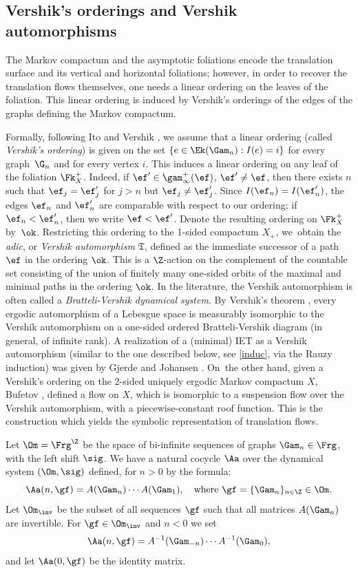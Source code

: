 \subsection{Vershik's orderings and Vershik automorphisms}
The Markov compactum and the asymptotic foliations encode the translation surface and its vertical and horizontal foliations; however, in order to recover the translation flows themselves, one needs a linear ordering on the leaves of the foliation. This linear ordering is induced by Vershik's orderings of the edges of the graphs defining the Markov compactum.

Formally, following Ito \cite{Ito} and Vershik \cite{Vershik1,Vershik2}, we assume that a linear ordering (called \emph{Vershik's ordering}) is given on the set $\{e\in \Ek(\Gam_n): I(e)=i\}$ for every graph~$\G_n$ and for every vertex $i$. This induces a linear ordering on any leaf of the foliation $\Fk_X^+$. Indeed, if $\ef' \in \gam_\infty^+(\ef)$, $\ef'\ne \ef$, then there exists $n$ such that $\ef_j = \ef_j'$ for $j>n$ but $\ef_j \ne \ef_j'$. Since $I(\ef_n) = I(\ef_n')$, the edges $\ef_n$ and $\ef_n'$ are comparable with respect to our ordering; if $\ef_n < \ef_n'$, then we write $\ef< \ef'$.
Denote the resulting ordering on $\Fk_X^+$ by~$\ok$.
Restricting this ordering to the 1-sided compactum $X_+$, we~obtain the \emph{adic}, or \emph{Vershik automorphism}
$\mathfrak{T}$, defined as the immediate successor of a path $\ef$ in the ordering $\ok$. This is a $\Z$-action on the complement of the countable set consisting of the union of finitely many one-sided orbits of the maximal and minimal paths in the ordering $\ok$. In the literature, the Vershik automorphism is often called a \emph{Bratteli-Vershik dynamical system}.
By Vershik's theorem \cite{Vershik1,Vershik2}, every ergodic automorphism of a Lebesgue space is measurably isomorphic to the Vershik automorphism on a one-sided ordered Bratteli-Vershik diagram (in general, of infinite rank). A realization of a (minimal) IET as a Vershik automorphism (similar to the one described below, see \eqref{induc}, via the Rauzy induction) was given by Gjerde and Johansen \cite{GJ}. On~the other hand, given a Vershik's ordering on the 2-sided uniquely ergodic Markov compactum $X$, Bufetov \cite{Buf-umn}, defined a flow on $X$, which is isomorphic to a suspension flow over the Vershik automorphism, with a piecewise-constant roof function. This is the construction which yields the symbolic representation of translation flows.

 Let $\Om=\Frg^\Z$ be the space of bi-infinite sequences of graphs $\Gam_n \in \Frg$, with the left shift
$\sig$. We have a natural cocycle $\Aa$ over the dynamical system $(\Om,\sig)$ defined, for $n>0$ by the formula:
\[
\Aa(n,\gf) = A(\Gam_n)\cdots A(\Gam_1),\quad \text{where } \gf = \{\Gam_n\}_{n\in \Z}\in \Om.
\]
Let $\Om_{\inv}$ be the subset of all sequences $\gf$ such that all matrices $A(\Gam_n)$ are invertible. For $\gf\in \Om_{\inv}$ and $n<0$ we set
\[
\Aa(n,\gf) = A^{-1}(\Gam_{-n})\cdots A^{-1}(\Gam_0),
\]
and let $\Aa(0,\gf)$ be the identity matrix.

